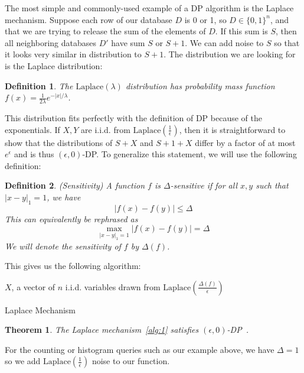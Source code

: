 \documentclass[11pt]{report}
\newtheorem{theorem}{Theorem}
\newtheorem{defn}{Definition}
\begin{document}
The most simple and commonly-used example of a DP algorithm is the Laplace mechanism. Suppose each row of our database $D$ is 0 or 1, so $D \in \{0, 1\}^n$, and that we are trying to release the sum of the elements of $D$. If this sum is $S$, then all neighboring databases $D'$ have sum $S$ or $S+1$. We can add noise to $S$ so that it looks very similar in distribution to $S+1$. The distribution we are looking for is the Laplace distribution:
\begin{defn}
The $\text{Laplace}(\lambda)$ distribution has probability mass function $f(x) = \frac{1}{2\lambda}e^{-|x|/\lambda}$.
\end{defn}
This distribution fits perfectly with the definition of DP because of the exponentials. If $X,Y$ are i.i.d. from $\text{Laplace}\left(\frac{1}{\epsilon}\right)$, then it is straightforward to show that the distributions of $S+X$ and $S+1+X$ differ by a factor of at most $e^\epsilon$ and is thus $(\epsilon, 0)$-DP. To generalize this statement, we will use the following definition:
\begin{defn}
(Sensitivity) A function $f$ is $\Delta$-sensitive if for all $x,y$ such that $|x-y|_1 = 1$, we have 
\[
|f(x) - f(y)| \leq \Delta
\]
This can equivalently be rephrased as 
\[
\max_{|x-y|_1=1}|f(x) - f(y)| = \Delta
\]
We will denote the sensitivity of $f$ by $\Delta(f)$.
\end{defn}
This gives us the following algorithm:

\begin{algorithm}\label{alg:1}
\SetAlgoLined
{}
$X$, a vector of $n$ i.i.d. variables drawn from $\text{Laplace}\left(\frac{\Delta(f)}{\epsilon}\right)$\;
\caption{Laplace Mechanism}
\end{algorithm}

\begin{theorem}
The Laplace mechanism~\ref{alg:1} satisfies $(\epsilon, 0)$-DP~\cite{Dwork:2006}.
\end{theorem}
For the counting or histogram queries such as our example above, we have $\Delta = 1$ so we add $\text{Laplace}\left(\frac{1}{\epsilon}\right)$ noise to our function.
\end{document}
